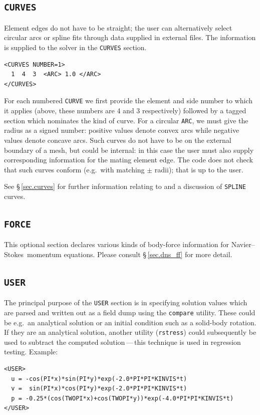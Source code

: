 \documentclass[11pt]{report}
\newcommand{\eg}{e.g.\ } \newcommand{\CC}{\mathrm{c.c.}}
\newcommand\NavSto{Navier--Stokes}
\begin{document}
\subsection{\texttt{CURVES}}
\label{sec.curvess}

Element edges do not have to be straight; the user can alternatively
select circular arcs or spline fits through data supplied in external
files.  The information is supplied to the solver in the \verb|CURVES|
section.
%
{\small
\begin{verbatim}
<CURVES NUMBER=1>
  1  4  3  <ARC> 1.0 </ARC>
</CURVES>
\end{verbatim}
}
%
For each numbered \verb|CURVE| we first provide the element and side
number to which it applies (above, these numbers are 4 and 3
respectively) followed by a tagged section which nominates the kind of
curve.  For a circular \verb|ARC|, we must give the radius as a signed
number: positive values denote convex arcs while negative values
denote concave arcs.  Such curves do not have to be on the external
boundary of a mesh, but could be internal: in this case the user must
also supply corresponding information for the mating element edge.  The
code does not check that such curves conform (\eg with matching $\pm$
radii); that is up to the user.

See \S\,\ref{sec.curves} for further information relating to and a
discussion of \verb|SPLINE| curves.

\subsection{\texttt{FORCE}}
\label{sec.force}

This optional section declares various kinds of body-force information
for \NavSto\ momentum equations.  Please consult \S\,\ref{sec.dns_ff}
for more detail.

\subsection{\texttt{USER}}
\label{sec.user}

The principal purpose of the \verb|USER| section is in specifying
solution values which are parsed and written out as a field dump using
the \verb|compare| utility.  These could be \eg an analytical solution
or an initial condition such as a solid-body rotation.  If they are an
analytical solution, another utility (\verb|rstress|) could
subsequently be used to subtract the computed solution\,---\,this
technique is used in regression testing. Example:
%
{\small
\begin{verbatim}
<USER>
  u = -cos(PI*x)*sin(PI*y)*exp(-2.0*PI*PI*KINVIS*t)
  v =  sin(PI*x)*cos(PI*y)*exp(-2.0*PI*PI*KINVIS*t)
  p = -0.25*(cos(TWOPI*x)+cos(TWOPI*y))*exp(-4.0*PI*PI*KINVIS*t)
</USER>
\end{verbatim}
}
\end{document}

